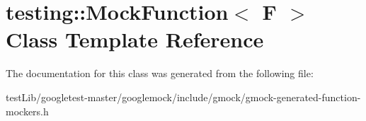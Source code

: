 \hypertarget{classtesting_1_1MockFunction}{}\section{testing\+:\+:Mock\+Function$<$ F $>$ Class Template Reference}
\label{classtesting_1_1MockFunction}


The documentation for this class was generated from the following file\+:\begin{DoxyCompactItemize}
\item 
test\+Lib/googletest-\/master/googlemock/include/gmock/gmock-\/generated-\/function-\/mockers.\+h\end{DoxyCompactItemize}
